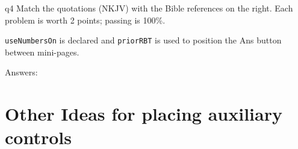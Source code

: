 \documentclass[11pt]{article}
\def\cs#1{\texttt{\eqbs#1}}
\begin{document}
\begin{quiz*}{q4}
Match the quotations (\textsf{NKJV)} with the Bible references on the right.
Each problem is worth 2 points; passing is 100\%.

\cs{useNumbersOn} is declared and \cs{priorRBT} is used to position the \textsf{Ans}
button between mini-pages.

\useMCCircles

\noindent
\begin{minipage}[t]{.75\linewidth-\eflength}
\useNumbersOn
\priorRBT{\makebox[0pt][l]{\hspace{\linewidth}\enspace#1\enspace}}
\adjCAB{}
\begin{questions}
\begin{BblPsg}
  \item{}
  \item{}
  \item{}
\end{BblPsg}

\end{questions}
\end{minipage}
\hfill
\begin{minipage}[t]{.25\linewidth}
\begin{questions}[itemsep={0pt},labelwidth={1em}]
\begin{BblVrs}
  \item{}
  \item{}
  \item{}
  \item{}
  \item{}
  \item{}
\end{BblVrs}
\end{questions}
\end{minipage}\hfil
\par\medskip
\end{quiz*}\quad\PointsField\currQuiz\olBdry\CorrButton\currQuiz\cgBdry[6pt]
Answers: 

\newpage

\section*{Other Ideas for placing auxiliary controls}
\end{document}

